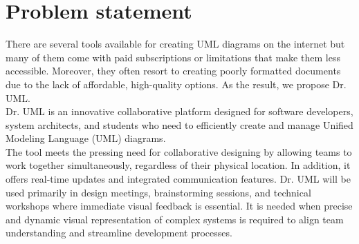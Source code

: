 \documentclass[12pt]{article}
\begin{document}



    \section{Problem statement}


    There are several tools available for creating UML diagrams on the internet but many of them come with paid subscriptions or limitations that make them less accessible. Moreover, they often resort to creating poorly formatted documents due to the lack of affordable, high-quality options. As the result, we propose Dr. UML.\\

    Dr. UML is an innovative collaborative platform designed for software developers, system architects, and students who need to efficiently create and manage Unified Modeling Language (UML) diagrams.\\

    The tool meets the pressing need for collaborative designing by allowing teams to work together simultaneously, regardless of their physical location. In addition, it offers real-time updates and integrated communication features. Dr. UML will be used primarily in design meetings, brainstorming sessions, and technical workshops where immediate visual feedback is essential. It is needed when precise and dynamic visual representation of complex systems is required to align team understanding and streamline development processes.\\
\end{document}
